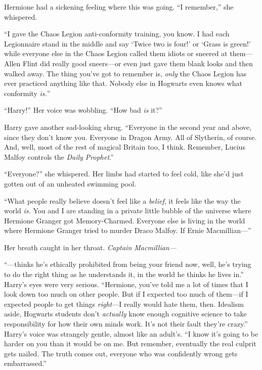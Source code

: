 Hermione had a sickening feeling where this was going. ``I remember,''
she whispered.

``I gave the Chaos Legion anti-conformity training, you know. I had each
Legionnaire stand in the middle and say `Twice two is four!' or `Grass
is green!' while everyone else in the Chaos Legion called them idiots or
sneered at them---Allen Flint did really good sneers---or even just gave
them blank looks and then walked away. The thing you've got to remember
is, \emph{only} the Chaos Legion has ever practiced anything like that.
Nobody else in Hogwarts even knows what conformity \emph{is.}''

``Harry!'' Her voice was wobbling. ``How bad \emph{is} it?''

Harry gave another sad-looking shrug. ``Everyone in the second year and
above, since they don't know you. Everyone in Dragon Army. All of
Slytherin, of course. And, well, most of the rest of magical Britain
too, I think. Remember, Lucius Malfoy controls the \emph{Daily
Prophet}.''

``Everyone?'' she whispered. Her limbs had started to feel cold, like
she'd just gotten out of an unheated swimming pool.

``What people really believe doesn't feel like a \emph{belief}, it feels
like the way the world \emph{is.} You and I are standing in a private
little bubble of the universe where Hermione Granger got Memory-Charmed.
Everyone else is living in the world where Hermione Granger tried to
murder Draco Malfoy. If Ernie Macmillian---''

Her breath caught in her throat. \emph{Captain Macmillian---}

``---thinks he's ethically prohibited from being your friend now, well,
he's trying to do the right thing as he understands it, in the world he
thinks he lives in.'' Harry's eyes were very serious. ``Hermione, you've
told me a lot of times that I look down too much on other people. But if
I expected too much of them---if I expected people to get things
\emph{right}---I really would hate them, then. Idealism aside, Hogwarts
students don't \emph{actually} know enough cognitive science to take
responsibility for how their own minds work. It's not their fault
they're crazy.'' Harry's voice was strangely gentle, almost like an
adult's. ``I know it's going to be harder on you than it would be on me.
But remember, eventually the real culprit gets nailed. The truth comes
out, everyone who was confidently wrong gets embarrassed.''

